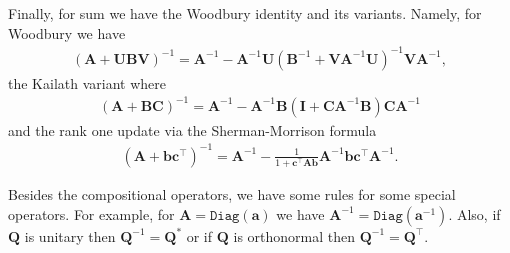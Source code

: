 \documentclass{article}
\newcommand{\mbf}[1]{{\boldsymbol{\mathbf{#1}}}}
\renewcommand{\bm}{\mbf}
\begin{document}
Finally, for sum we have the Woodbury identity and its variants.
Namely, for Woodbury we have
\begin{equation*}
    \begin{split}
      \left(\bm{A} + \bm{U} \bm{B} \bm{V}\right)^{-1}
      =
      \bm{A}^{-1} -
      \bm{A}^{-1} \bm{U} \left(\bm{B}^{-1} + \bm{V} \bm{A}^{-1} \bm{U}\right)^{-1} \bm{V} \bm{A}^{-1}
      ,
    \end{split}
\end{equation*}
the Kailath variant where
\begin{equation*}
    \begin{split}
      \left(\bm{A} + \bm{B} \bm{C}\right)^{-1}
      =
      \bm{A}^{-1}
      -
      \bm{A}^{-1}\bm{B}\left(\bm{I} + \bm{C} \bm{A}^{-1} \bm{B}\right)\bm{C} \bm{A}^{-1}
    \end{split}
\end{equation*}
and the rank one update via the Sherman-Morrison formula
\begin{equation*}
    \begin{split}
      \left(\bm{A} + \bm{b} \bm{c}^{\intercal}\right)^{-1}
      =
      \bm{A}^{-1} -
      \frac{1}{1 + \bm{c}^{\intercal} \bm{A} \bm{b}}
      \bm{A}^{-1}\bm{b} \bm{c}^{\intercal} \bm{A}^{-1}
      .
    \end{split}
\end{equation*}

Besides the compositional operators, we have some rules for some special operators.
For example, for $\bm{A} = \texttt{Diag}\left(\bm{a}\right)$ we have
$\bm{A}^{-1} = \texttt{Diag}\left(\bm{a}^{-1}\right)$.
Also, if $\bm{Q}$ is unitary then $\bm{Q}^{-1} = \bm{Q}^{*}$
or if $\bm{Q}$ is orthonormal then $\bm{Q}^{-1} = \bm{Q}^{\intercal}$.
\end{document}

